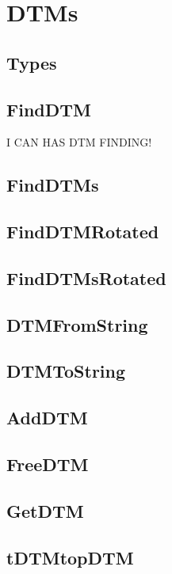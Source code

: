 \documentclass[a4paper]{report}
\begin{document}

\section{DTMs}

\subsection{Types}

\subsection{FindDTM}

I CAN HAS DTM FINDING!

\subsection{FindDTMs}

\subsection{FindDTMRotated}

\subsection{FindDTMsRotated}

\subsection{DTMFromString}

\subsection{DTMToString}

\subsection{AddDTM}

\subsection{FreeDTM}

\subsection{GetDTM}

\subsection{tDTMtopDTM}
\end{document}

